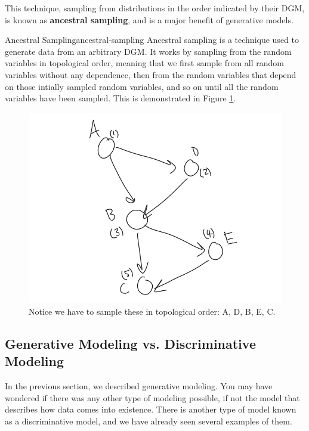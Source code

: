 This technique, sampling from distributions in the order indicated by their DGM, is known as \textbf{ancestral sampling}, and is a major benefit of generative models.

\begin{definition}{Ancestral Sampling}{ancestral-sampling}
	Ancestral sampling is a technique used to generate data from an arbitrary DGM. It works by sampling from the random variables in topological order, meaning that we first sample from all random variables without any dependence, then from the random variables that depend on those intially sampled random variables, and so on until all the random variables have been sampled. This is demonstrated in Figure \ref{fig:ancestral-sampling}.
\end{definition}
\begin{figure}
	\centering
	\includegraphics[width=0.5\paperwidth]{../GraphicalModels/fig/AncestralSampling.png}
    \caption{Notice we have to sample these in topological order: A, D, B, E, C.}
	\label{fig:ancestral-sampling}
\end{figure}

\subsection{Generative Modeling vs. Discriminative Modeling}
In the previous section, we described generative modeling. You may have wondered if there was any other type of modeling possible, if not the model that describes how data comes into existence. There is another type of model known as a discriminative model, and we have already seen several examples of them.

